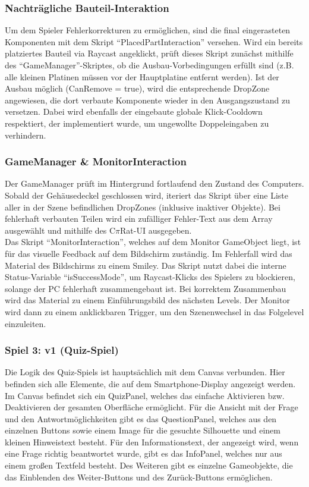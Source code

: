 \subsubsection*{Nachträgliche Bauteil-Interaktion}
Um dem Spieler Fehlerkorrekturen zu ermöglichen, sind die final eingerasteten Komponenten mit dem Skript “PlacedPartInteraction” versehen. Wird ein bereits platziertes Bauteil via Raycast angeklickt, prüft dieses Skript zunächst mithilfe des “GameManager”-Skriptes, ob die Ausbau-Vorbedingungen erfüllt sind (z.B. alle kleinen Platinen müssen vor der Hauptplatine entfernt werden). Ist der Ausbau möglich (CanRemove = true), wird die entsprechende DropZone angewiesen, die dort verbaute Komponente wieder in den Ausgangszustand zu versetzen. Dabei wird ebenfalls der eingebaute globale Klick-Cooldown respektiert, der implementiert wurde, um ungewollte Doppeleingaben zu verhindern.

\subsubsection*{GameManager \& MonitorInteraction}
Der GameManager prüft im Hintergrund fortlaufend den Zustand des Computers. Sobald der Gehäusedeckel geschlossen wird, iteriert das Skript über eine Liste aller in der Szene befindlichen DropZones (inklusive inaktiver Objekte). Bei fehlerhaft verbauten Teilen wird ein zufälliger Fehler-Text aus dem Array ausgewählt und mithilfe des C$\pi$Rat-UI ausgegeben.\\
Das Skript “MonitorInteraction”, welches auf dem Monitor GameObject liegt, ist für das visuelle Feedback auf dem Bildschirm zuständig. Im Fehlerfall wird das Material des Bildschirms zu einem Smiley. Das Skript nutzt dabei die interne Status-Variable “isSuccessMode”, um Raycast-Klicks des Spielers zu blockieren, solange der PC fehlerhaft zusammengebaut ist. Bei korrektem Zusammenbau wird das Material zu einem Einführungsbild des nächsten Levels. Der Monitor wird dann zu einem anklickbaren Trigger, um den Szenenwechsel in das Folgelevel einzuleiten.

\subsubsection{Spiel 3: v1 (Quiz-Spiel)}
Die Logik des Quiz-Spiels ist hauptsächlich mit dem Canvas verbunden. Hier befinden sich alle Elemente, die auf dem Smartphone-Display angezeigt werden. Im Canvas befindet sich ein QuizPanel, welches das einfache Aktivieren bzw. Deaktivieren der gesamten Oberfläche ermöglicht. Für die Ansicht mit der Frage und den Antwortmöglichkeiten gibt es das QuestionPanel, welches aus den einzelnen Buttons sowie einem Image für die gesuchte Silhouette und einem kleinen Hinweistext besteht. Für den Informationstext, der angezeigt wird, wenn eine Frage richtig beantwortet wurde, gibt es das InfoPanel, welches nur aus einem großen Textfeld besteht. Des Weiteren gibt es einzelne Gameobjekte, die das Einblenden des Weiter-Buttons und des Zurück-Buttons ermöglichen.

